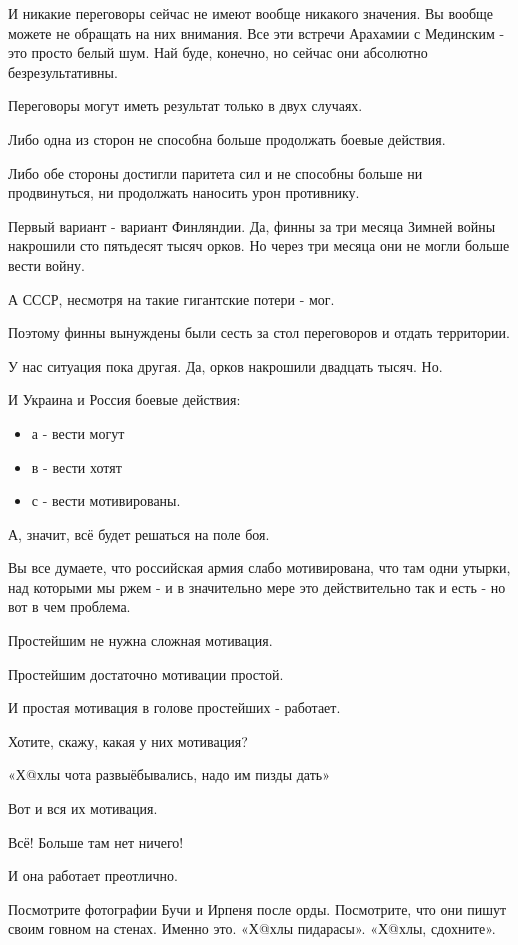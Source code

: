 И никакие переговоры сейчас не имеют вообще никакого значения. Вы вообще можете
не обращать на них внимания. Все эти встречи Арахамии с Мединским - это просто
белый шум. Най буде, конечно, но сейчас они абсолютно безрезультативны. 

Переговоры могут иметь результат только в двух случаях. 

Либо одна из сторон не способна больше продолжать боевые действия. 

Либо обе стороны достигли паритета сил и не способны больше ни продвинуться, ни
продолжать наносить урон противнику. 

Первый вариант - вариант Финляндии. Да, финны за три месяца Зимней войны
накрошили сто пятьдесят тысяч орков. Но через три месяца они не могли больше
вести войну. 

А СССР, несмотря на такие гигантские потери - мог. 

Поэтому финны вынуждены были сесть за стол переговоров и отдать территории. 

У нас ситуация пока другая. Да, орков накрошили двадцать тысяч. Но.

И Украина и Россия боевые действия: 

\begin{itemize}
  \item а - вести могут
  \item в - вести хотят
  \item с - вести мотивированы.
\end{itemize}

А, значит, всё будет решаться на поле боя. 

Вы все думаете, что российская армия слабо мотивирована, что там одни утырки,
над которыми мы ржем - и в значительно мере это действительно так и есть - но
вот в чем проблема. 

Простейшим не нужна сложная мотивация. 

Простейшим достаточно мотивации простой. 

И простая мотивация в голове простейших - работает. 

Хотите, скажу, какая у них мотивация? 

«Х@хлы чота развыёбывались, надо им пизды дать»

Вот и вся их мотивация. 

Всё! Больше там нет ничего! 

И она работает преотлично.

Посмотрите фотографии Бучи и Ирпеня после орды. Посмотрите, что они пишут своим
говном на стенах. Именно это. «Х@хлы пидарасы». «Х@хлы, сдохните». 


